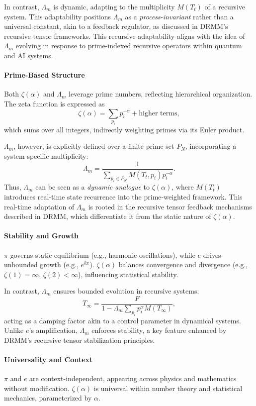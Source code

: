 \documentclass{article}
\theoremstyle{plain}
\begin{document}
In contrast, \(\Lambda_m\) is dynamic, adapting to the multiplicity \(M(T_t)\) of a recursive system. This adaptability positions \(\Lambda_m\) as a \textit{process-invariant} rather than a universal constant, akin to a feedback regulator, as discussed in DRMM's recursive tensor frameworks. This recursive adaptability aligns with the idea of \(\Lambda_m\) evolving in response to prime-indexed recursive operators within quantum and AI systems.

\paragraph{Prime-Based Structure}
Both \(\zeta(\alpha)\) and \(\Lambda_m\) leverage prime numbers, reflecting hierarchical organization. The zeta function is expressed as
\[
\zeta(\alpha) = \sum_{p_i} p_i^{-\alpha} + \text{higher terms},
\]
which sums over all integers, indirectly weighting primes via its Euler product. 

\(\Lambda_m\), however, is explicitly defined over a finite prime set \(P_N\), incorporating a system-specific multiplicity:
\[
\Lambda_m = \frac{1}{\sum_{p_i \in P_N} M(T_t, p_i) p_i^{-\alpha}}.
\]
Thus, \(\Lambda_m\) can be seen as a \textit{dynamic analogue} to \(\zeta(\alpha)\), where \(M(T_t)\) introduces real-time state recurrence into the prime-weighted framework. This real-time adaptation of \(\Lambda_m\) is rooted in the recursive tensor feedback mechanisms described in DRMM, which differentiate it from the static nature of \(\zeta(\alpha)\).

\paragraph{Stability and Growth}
\(\pi\) governs static equilibrium (e.g., harmonic oscillations), while \(e\) drives unbounded growth (e.g., \(e^{kx}\)). \(\zeta(\alpha)\) balances convergence and divergence (e.g., \(\zeta(1) = \infty\), \(\zeta(2) < \infty\)), influencing statistical stability.

In contrast, \(\Lambda_m\) ensures bounded evolution in recursive systems:
\[
T_\infty = \frac{F}{1 - \Lambda_m \sum_{p_i} p_i^\alpha M(T_\infty)},
\]
acting as a damping factor akin to a control parameter in dynamical systems. Unlike \(e\)'s amplification, \(\Lambda_m\) enforces stability, a key feature enhanced by DRMM's recursive tensor stabilization principles.

\paragraph{Universality and Context}
\(\pi\) and \(e\) are context-independent, appearing across physics and mathematics without modification. \(\zeta(\alpha)\) is universal within number theory and statistical mechanics, parameterized by \(\alpha\). 
\end{document}
